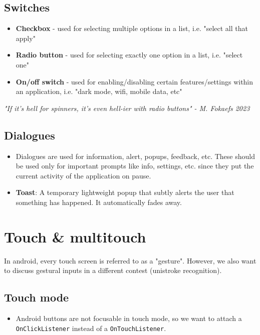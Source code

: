 \documentclass[12pt]{book}
\begin{document}
\subsection*{Switches}

\begin{itemize}
  \item \textbf{Checkbox} - used for selecting multiple options in a list, i.e. "select all that apply"
  \item \textbf{Radio button} - used for selecting exactly one option in a list, i.e. "select one"
  \item \textbf{On/off switch} - used for enabling/disabling certain features/settings within an application, i.e. "dark mode, wifi, mobile data, etc"
\end{itemize}

\textit{"If it's hell for spinners, it's even hell-ier with radio buttons" - M. Fokaefs 2023}

\subsection*{Dialogues}
\begin{itemize}
  \item Dialogues are used for information, alert, popups, feedback, etc. These should be used only for important prompts like info, settings, etc. since they put the current activity of the application on pause.
  \item \textbf{Toast}: A temporary lightweight popup that subtly alerts the user that something has happened. It automatically fades away.
\end{itemize}

\section*{Touch \& multitouch}

In android, every touch screen is referred to as a "gesture". However, we also want to discuss gestural inputs in a different contest (unistroke recognition).

\subsection*{Touch mode}
\begin{itemize}
  \item Android buttons are not focusable in touch mode, so we want to attach a \texttt{OnClickListener} instead of a \texttt{OnTouchListener}.
\end{itemize}
\end{document}
